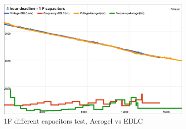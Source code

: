 \begin{figure}[ht] \centering
\includegraphics[width=0.85\textwidth]{img/captest1.png}
\caption{1F different capacitors test, Aerogel vs EDLC}
\end{figure}


